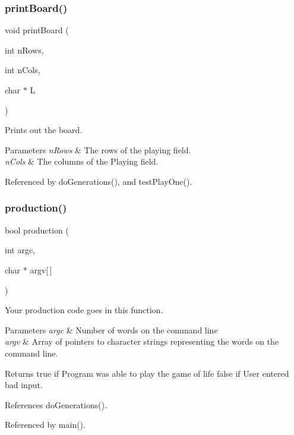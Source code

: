 \subsubsection{print\+Board()}
{\footnotesize\ttfamily void print\+Board (\begin{DoxyParamCaption}\item[{int}]{n\+Rows,  }\item[{int}]{n\+Cols,  }\item[{char $\ast$}]{L }\end{DoxyParamCaption})}

Prints out the board.


\begin{DoxyParams}{Parameters}
{\em n\+Rows} & The rows of the playing field. \\
\hline
{\em n\+Cols} & The columns of the Playing field. \\
\hline
\end{DoxyParams}


Referenced by do\+Generations(), and test\+Play\+One().

\mbox{\label{production_8c_a9f67b51c42a54745557e7a2c9c07c46f}} 
\subsubsection{production()}
{\footnotesize\ttfamily bool production (\begin{DoxyParamCaption}\item[{int}]{argc,  }\item[{char $\ast$}]{argv[$\,$] }\end{DoxyParamCaption})}

Your production code goes in this function.


\begin{DoxyParams}{Parameters}
{\em argc} & Number of words on the command line \\
\hline
{\em argv} & Array of pointers to character strings representing the words on the command line. \\
\hline
\end{DoxyParams}
\begin{DoxyReturn}{Returns}
true if Program was able to play the game of life false if User entered bad input. 
\end{DoxyReturn}


References do\+Generations().



Referenced by main().

